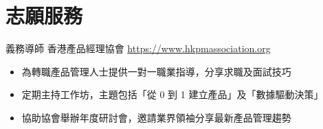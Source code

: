\documentclass[a4paper, serif, 10pt]{moderncv}
\begin{document}
\section{志願服務}

        {義務導師}
        {香港產品經理協會}
        {\url{https://www.hkpmassociation.org}}
        {}
        {\begin{itemize}
\item 為轉職產品管理人士提供一對一職業指導，分享求職及面試技巧
\item 定期主持工作坊，主題包括「從 0 到 1 建立產品」及「數據驅動決策」
\item 協助協會舉辦年度研討會，邀請業界領袖分享最新產品管理趨勢
\end{itemize}}
    
\end{document}
